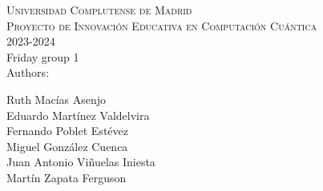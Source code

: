 \documentclass[11pt]{article}
\begin{document}
\begin{center}
            \textsc{Universidad Complutense de Madrid}\\
            \huge\textsc{Proyecto de Innovación Educativa en
Computación Cuántica}\\ \vspace{.1cm}
            \large 2023-2024\\ \vspace{.2cm}
            \LARGE Friday group 1 \\ \vspace{.2cm}
            \normalsize Authors:\\ \vspace{.2cm}
            \begin{multicols}{3}
             Ruth Macías Asenjo \\  Eduardo Martínez Valdelvira\\
             Fernando Poblet Estévez \\ Miguel González Cuenca\\
              Juan Antonio Viñuelas Iniesta \\ Martín Zapata Ferguson
            \end{multicols}
\end{center}
\end{document}
